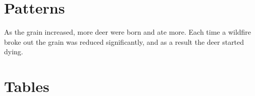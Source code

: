 \documentclass[12pt]{article}
\begin{document}
\section*{Patterns}

As the grain increased, more deer were born and ate more. Each time a
wildfire broke out the grain was reduced significantly, and as a result
the deer started dying.

\section*{Tables}

\begin{figure*}[b]

\end{figure*}
\end{document}
